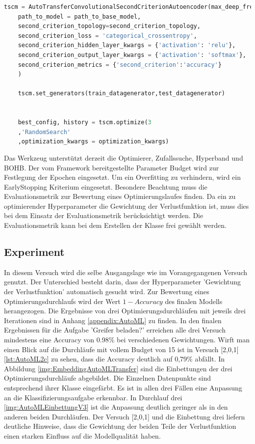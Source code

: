 	\begin{lstlisting}[language=python,caption=Beispiel AutoTransferSecondCriterionAutoenocder in Python, label=lst:BspAutoTransferSecondCriterionAutoenocder]
	tscm = AutoTransferConvolutionalSecondCriterionAutoencoder(max_deep_freeze=2,
	path_to_model = path_to_base_model,            
	second_criterion_topology=second_criterion_topology,
	second_criterion_loss = 'categorical_crossentropy',                                                                                                   
	second_criterion_hidden_layer_kwargs = {'activation': 'relu'},
	second_criterion_output_layer_kwargs = {'activation': 'softmax'},
	second_criterion_metrics = {'second_criterion':'accuracy'}
	)
	
	tscm.set_generators(train_datagenerator,test_datagenerator)
	
	
	best_config, history = tscm.optimize(3
	,'RandomSearch'
	,optimization_kwargs = optimization_kwargs)
	\end{lstlisting}
	Das Werkzeug unterstützt derzeit die Optimierer, Zufallssuche, Hyperband und BOHB. Der vom Framework bereitgestellte Parameter Budget wird zur Festlegung der Epochen eingesetzt. Um ein Overfitting zu verhindern, wird ein EarlyStopping Kriterium eingesetzt. 
	Besondere Beachtung muss die Evaluationsmetrik zur Bewertung eines Optimierungslaufes finden. Da ein zu optimierender Hyperparameter die Gewichtung der Verlustfunktion ist, muss dies bei dem Einsatz der Evaluationsmetrik berücksichtigt werden. Die Evaluationsmetrik kann bei dem Erstellen der Klasse frei gewählt werden.
	
	\subsection{Experiment}
	\label{subsec:AutoMLExperiment}
	In diesem Versuch wird die selbe Ausgangslage wie im Vorangegangenen Versuch genutzt. Der Unterschied besteht darin, dass der Hyperparameter 'Gewichtung der Verlustfunktion' automatisch gesucht wird. Zur Bewertung eines Optimierungsdurchlaufs wird der Wert $1-Accuracy$ des finalen Modells herangezogen. Die Ergebnisse von drei Optimierungsdurchläufen mit jeweils drei Iterationen sind in Anhang \ref{appendix:AutoML} zu finden. In den finalen Ergebnissen für die Aufgabe 'Greifer beladen?' erreichen alle drei Versuch mindestens eine Accuracy von 0.98\% bei verschiedenen Gewichtungen.  Wirft man einen Blick auf die Durchläufe mit vollem Budget von 15 ist in Versuch [2,0,1] \ref{lst:AutoML2c} zu sehen, dass die Accuracy deutlich auf 0,79\% abfällt. In Abbildung \ref{img:EmbeddingAutoMLTransfer} sind die Einbettungen der drei Optimierungsdurchläufe abgebildet. Die Einzelnen Datenpunkte sind entsprechend ihrer Klasse eingefärbt. Es ist in allen drei Fällen eine Anpassung an die Klassifizierungsaufgabe erkennbar. In Durchlauf drei \ref{img:AutoMLEinbettungV3} ist die Anpassung deutlich geringer als in den anderen beiden Durchläufen. Der Versuch [2,0,1] und die Einbettung drei liefern deutliche Hinweise, dass die Gewichtung der beiden Teile der Verlustfunktion einen starken Einfluss auf die Modellqualität haben. 
	
